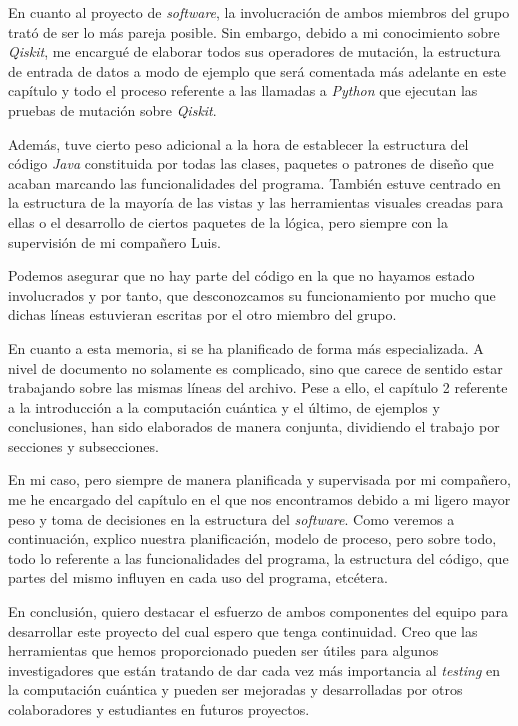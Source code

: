 En cuanto al proyecto de \textit{software}, la involucración de ambos miembros del grupo trató de ser lo más pareja posible. Sin embargo, debido a mi conocimiento sobre \textit{Qiskit}, me encargué de elaborar todos sus operadores de mutación, la estructura de entrada de datos a modo de ejemplo que será comentada más adelante en este capítulo y todo el proceso referente a las llamadas a \textit{Python} que ejecutan las pruebas de mutación sobre \textit{Qiskit}.

Además, tuve cierto peso adicional a la hora de establecer la estructura del código \textit{Java}  constituida por todas las clases, paquetes o patrones de diseño que acaban marcando las funcionalidades del programa. También estuve centrado en la estructura de la mayoría de las vistas y las herramientas visuales creadas para ellas o el desarrollo de ciertos paquetes de la lógica, pero siempre con la supervisión de mi compañero Luis.

Podemos asegurar que no hay parte del código en la que no hayamos estado involucrados y por tanto, que desconozcamos su funcionamiento por mucho que dichas líneas estuvieran escritas por el otro miembro del grupo.

En cuanto a esta memoria, si se ha planificado de forma más especializada. A nivel de documento no solamente es complicado, sino que carece de sentido estar trabajando sobre las mismas líneas del archivo. Pese a ello, el capítulo 2 referente a la introducción a la computación cuántica y el último, de ejemplos y conclusiones, han sido elaborados de manera conjunta, dividiendo el trabajo por secciones y subsecciones.

En mi caso, pero siempre de manera planificada y supervisada por mi compañero, me he encargado del capítulo en el que nos encontramos debido a mi ligero mayor peso y toma de decisiones en la estructura del \textit{software}. Como veremos a continuación, explico nuestra planificación, modelo de proceso, pero sobre todo, todo lo referente a las funcionalidades del programa, la estructura del código, que partes del mismo influyen en cada uso del programa, etcétera.

En conclusión, quiero destacar el esfuerzo de ambos componentes del equipo para desarrollar este proyecto del cual espero que tenga continuidad. Creo que las herramientas que hemos proporcionado pueden ser útiles para algunos investigadores que están tratando de dar cada vez más importancia al \textit{testing} en la computación cuántica y pueden ser mejoradas y desarrolladas por otros colaboradores y estudiantes en futuros proyectos.

